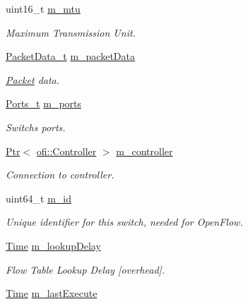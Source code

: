 \begin{DoxyCompactItemize}
uint16\+\_\+t \hyperlink{classns3_1_1OpenFlowSwitchNetDevice_a32d177d10cd1c5a266db9f4014cd7384}{m\+\_\+mtu}
\begin{DoxyCompactList}\small\item\em Maximum Transmission Unit. \end{DoxyCompactList}\item 
\hyperlink{classns3_1_1OpenFlowSwitchNetDevice_aa060d5a2f51e59a59ca58bbc08c0d524}{Packet\+Data\+\_\+t} \hyperlink{classns3_1_1OpenFlowSwitchNetDevice_a7e0e79f1cdc4d37c13fc53c2ff8506b3}{m\+\_\+packet\+Data}
\begin{DoxyCompactList}\small\item\em \hyperlink{classns3_1_1Packet}{Packet} data. \end{DoxyCompactList}\item 
\hyperlink{classns3_1_1OpenFlowSwitchNetDevice_ae1b61b1f99b795b70b1bdf2f8d51d99e}{Ports\+\_\+t} \hyperlink{classns3_1_1OpenFlowSwitchNetDevice_a5262a28722c2342816dfda05744dcfd2}{m\+\_\+ports}
\begin{DoxyCompactList}\small\item\em Switch\textquotesingle{}s ports. \end{DoxyCompactList}\item 
\hyperlink{classns3_1_1Ptr}{Ptr}$<$ \hyperlink{classns3_1_1ofi_1_1Controller}{ofi\+::\+Controller} $>$ \hyperlink{classns3_1_1OpenFlowSwitchNetDevice_adbded8b966a707ca33bb225b33809e49}{m\+\_\+controller}
\begin{DoxyCompactList}\small\item\em Connection to controller. \end{DoxyCompactList}\item 
uint64\+\_\+t \hyperlink{classns3_1_1OpenFlowSwitchNetDevice_a0af690c63ccd5d84b4abd671213086b2}{m\+\_\+id}
\begin{DoxyCompactList}\small\item\em Unique identifier for this switch, needed for Open\+Flow. \end{DoxyCompactList}\item 
\hyperlink{classns3_1_1Time}{Time} \hyperlink{classns3_1_1OpenFlowSwitchNetDevice_aa408b593e982502e0939dba57aa4c907}{m\+\_\+lookup\+Delay}
\begin{DoxyCompactList}\small\item\em Flow Table Lookup Delay \mbox{[}overhead\mbox{]}. \end{DoxyCompactList}\item 
\hyperlink{classns3_1_1Time}{Time} \hyperlink{classns3_1_1OpenFlowSwitchNetDevice_a53db2fcee324af42c9d7364c76708423}{m\+\_\+last\+Execute}

\end{DoxyCompactItemize}
